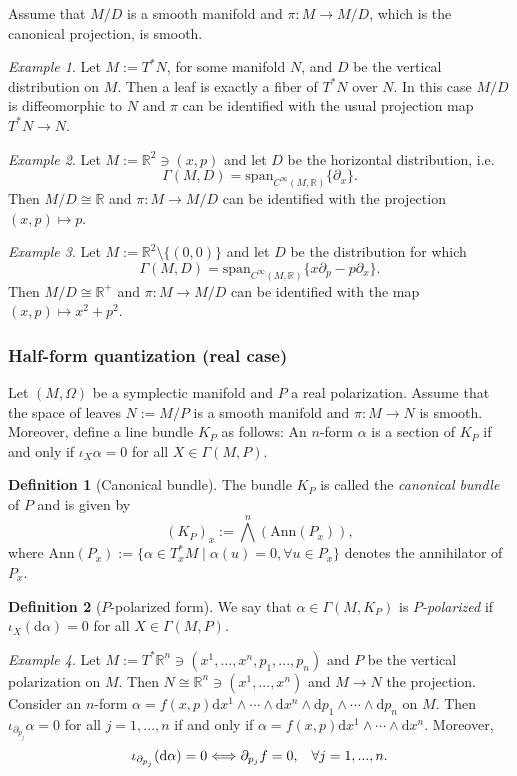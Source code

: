 \documentclass[12pt]{amsart}
\numberwithin{equation}{section}
\theoremstyle{plain}
\theoremstyle{definition}
\newtheorem{defn}{Definition}[subsection]
\theoremstyle{remark}
\newtheorem{ex}{Example}[subsection]
\newcommand{\R}{\mathbb{R}}
\newcommand{\dd}{{\mathrm{d}}}
\begin{document}
Assume that $M/D$ is a smooth manifold and $\pi\colon M\to M/D$, which is the canonical projection, is smooth. 

\begin{ex}
Let $M:=T^*N$, for some manifold $N$, and $D$ be the vertical distribution on $M$. Then a leaf is exactly a fiber of $T^*N$ over $N$. In this case $M/D$ is diffeomorphic to $N$ and $\pi$ can be identified with the usual projection map $T^*N\to N$.
\end{ex}


\begin{ex}
Let $M:=\R^2\ni(x,p)$ and let $D$ be the horizontal distribution, i.e. $$\Gamma(M,D)=\mathrm{span}_{C^\infty(M,\R)}\{\partial_x\}.$$ Then $M/D\cong \R$ and $\pi\colon M\to M/D$ can be identified with the projection $(x,p)\mapsto p$.
\end{ex}

\begin{ex}
Let $M:=\R^2\setminus\{(0,0)\}$ and let $D$ be the distribution for which $$\Gamma(M,D)=\mathrm{span}_{C^\infty(M,\R)}\{x\partial_p-p\partial_x\}.$$ Then $M/D\cong \R^+$ and $\pi\colon M\to M/D$ can be identified with the map $(x,p)\mapsto x^2+p^2$.
\end{ex}

\subsubsection{Half-form quantization (real case)}
Let $(M,\Omega)$ be a symplectic manifold and $P$ a real polarization. Assume that the space of leaves $N:=M/P$ is a smooth manifold and $\pi\colon M\to N$ is smooth. Moreover, define a line bundle $K_P$ as follows: An $n$-form $\alpha$ is a section of $K_P$ if and only if $\iota_X\alpha=0$ for all $X\in\Gamma(M,P)$. 

\begin{defn}[Canonical bundle]
The bundle $K_P$ is called the \emph{canonical bundle} of $P$ and is given by 
$$(K_P)_x:=\bigwedge^n\left(\mathrm{Ann}(P_x)\right),$$
where $\mathrm{Ann}(P_x):=\{\alpha\in T^*_xM\mid \alpha(u)=0,\forall u\in P_x\}$ denotes the annihilator of $P_x$.
\end{defn}

\begin{defn}[$P$-polarized form]
We say that $\alpha\in\Gamma(M,K_P)$ is \emph{$P$-polarized} if $\iota_X(\dd\alpha)=0$ for all $X\in\Gamma(M,P)$.
\end{defn}

\begin{ex}
Let $M:=T^*\R^n\ni (x^1,...,x^n,p_1,...,p_n)$ and $P$ be the vertical polarization on $M$. Then $N\cong \R^n\ni(x^1,...,x^n)$ and $M\to N$ the projection. Consider an $n$-form $\alpha=f(x,p)\dd x^1\land\dotsm \land\dd x^n\land \dd p_1\land\dotsm \land \dd p_n$ on $M$. Then $\iota_{\partial_{p_j}}\alpha=0$ for all $j=1,...,n$ if and only if $\alpha=f(x,p)\dd x^1\land\dotsm  \land \dd x^n$. Moreover, 
\begin{equation}
\label{moreover}
\iota_{\partial_{p_j}}(\dd\alpha)=0\Longleftrightarrow\partial_{p_j}f=0, \hspace{0.3cm}\forall j=1,...,n.
\end{equation}
\end{ex}
\end{document}
